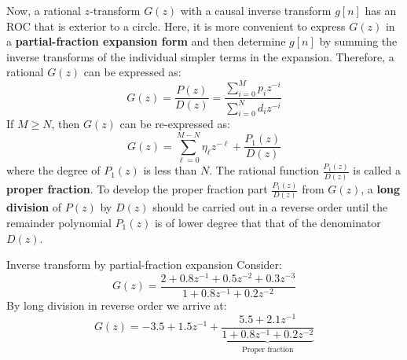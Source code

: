 \documentclass[../../main/main.tex]{subfiles}
\begin{document}
\medskip
Now, a rational \( z \)-transform \( G(z) \) with a causal inverse transform \( g[n] \) has an ROC that is exterior to a circle.
Here, it is more convenient to express \( G(z) \) in a \textbf{partial-fraction expansion form} and then determine \( g[n] \) by summing the inverse transforms of the individual simpler terms in the expansion. Therefore, a rational \( G(z) \) can be expressed as:
\begin{equation}
    G(z)
    =
    \frac{P(z)}{D(z)}
    =
    \frac{\displaystyle \sum_{i=0}^{M} p_{i}z^{-i}}{\displaystyle \sum_{i=0}^{N} d_{i}z^{-i}}
    \label{eq:L14_S51_1}
\end{equation}
If \( M \ge N \), then \( G(z) \) can be re-expressed as:
\begin{equation}
    G(z)
    =
    \sum_{\ell=0}^{M-N} \eta_{\ell}z^{-\ell} + \frac{P_{1}(z)}{D(z)}
    \label{eq:L14_S51_2}
\end{equation}
where the degree of \( P_{1}(z) \) is less than \( N \). The rational function \( \frac{P_{1}(z)}{D(z)} \) is called a \textbf{proper fraction}.
To develop the proper fraction part \( \frac{P_{1}(z)}{D(z)} \) from \( G(z) \), a \textbf{long division} of \( P(z) \) by \( D(z) \) should be carried out in a reverse order until the remainder polynomial \( P_{1}(z) \) is of lower degree that that of the denominator \( D(z) \).

\begin{example}{Inverse transform by partial-fraction expansion}{}
    Consider:
    \begin{equation}
        G(z)
        =
        \frac{2 + 0.8z^{-1} + 0.5z^{-2} + 0.3z^{-3}}{1 + 0.8z^{-1} + 0.2z^{-2}}
        \label{eq:L14_S53_1}
    \end{equation}
    By long division in reverse order we arrive at:
    \begin{equation}
        G(z)
        =
        -3.5 + 1.5z^{-1} + \underbrace{\frac{5.5 + 2.1z^{-1}}{1 + 0.8z^{-1} + 0.2z^{-2}}}_{\text{Proper fraction}}
        \label{eq:L14_S53_2}
    \end{equation}
\end{example}
\end{document}
